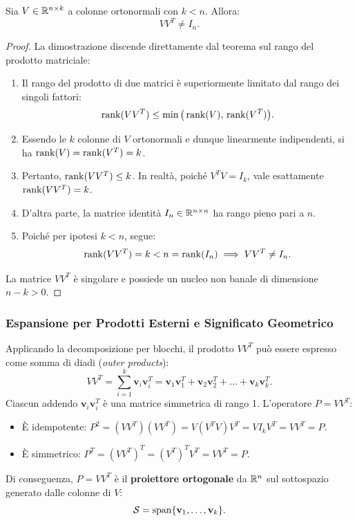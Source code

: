 \begin{theorem}
Sia $V \in \mathbb{R}^{n \times k}$ a colonne ortonormali con $k < n$. Allora:
\begin{equation}
    V V^T \neq I_n.
\end{equation}
\end{theorem}

\begin{proof}
La dimostrazione discende direttamente dal teorema sul rango del prodotto matriciale:
\begin{enumerate}
    \item Il rango del prodotto di due matrici \`e superiormente limitato dal rango dei singoli fattori:
    \begin{equation}
        \operatorname{rank}(V V^T) \le \min\big(\operatorname{rank}(V), \, \operatorname{rank}(V^T)\big).
    \end{equation}
    \item Essendo le $k$ colonne di $V$ ortonormali e dunque linearmente indipendenti, si ha $\operatorname{rank}(V) = \operatorname{rank}(V^T) = k$.
    \item Pertanto, $\operatorname{rank}(V V^T) \le k$. In realt\`a, poich\'e $V^T V = I_k$, vale esattamente $\operatorname{rank}(V V^T) = k$.
    \item D'altra parte, la matrice identit\`a $I_n \in \mathbb{R}^{n \times n}$ ha rango pieno pari a $n$.
    \item Poich\'e per ipotesi $k < n$, segue:
    \begin{equation}
        \operatorname{rank}(V V^T) = k < n = \operatorname{rank}(I_n) \implies V V^T \neq I_n.
    \end{equation}
\end{enumerate}
La matrice $V V^T$ \`e singolare e possiede un nucleo non banale di dimensione $n - k > 0$.
\end{proof}

\subsubsection{Espansione per Prodotti Esterni e Significato Geometrico}
Applicando la decomposizione per blocchi, il prodotto $V V^T$ pu\`o essere espresso come somma di diadi (\textit{outer products}):
\begin{equation}
    V V^T = \sum_{i=1}^k \mathbf{v}_i \mathbf{v}_i^T = \mathbf{v}_1 \mathbf{v}_1^T + \mathbf{v}_2 \mathbf{v}_2^T + \dots + \mathbf{v}_k \mathbf{v}_k^T.
\end{equation}
Ciascun addendo $\mathbf{v}_i \mathbf{v}_i^T$ \`e una matrice simmetrica di rango 1. L'operatore $P = V V^T$:
\begin{itemize}
    \item \`E idempotente: $P^2 = (V V^T)(V V^T) = V (V^T V) V^T = V I_k V^T = V V^T = P$.
    \item \`E simmetrico: $P^T = (V V^T)^T = (V^T)^T V^T = V V^T = P$.
\end{itemize}
Di conseguenza, $P = V V^T$ \`e il \textbf{proiettore ortogonale} da $\mathbb{R}^n$ sul sottospazio generato dalle colonne di $V$:
\begin{equation}
    \mathcal{S} = \operatorname{span}\{\mathbf{v}_1, \dots, \mathbf{v}_k\}.
\end{equation}

